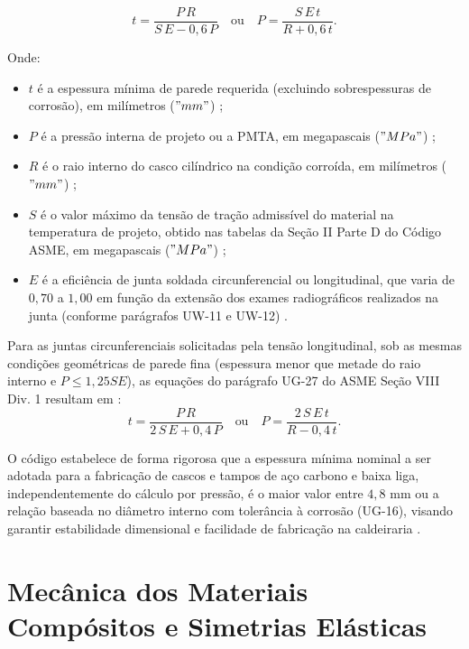 \begin{equation}
    t = \frac{P \, R}{S \, E - 0{,}6 \, P} \quad \text{ou} \quad P = \frac{S \, E \, t}{R + 0{,}6 \, t}.
\end{equation} \label{eq-asme-circunferencial}

Onde:

\begin{itemize}
  \item $t$ é a espessura mínima de parede requerida (excluindo sobrespessuras de corrosão), em milímetros ($"mm"$) \cite{asme_sec8_div1_2019};
  \item $P$ é a pressão interna de projeto ou a PMTA, em megapascais ($"MPa"$) \cite{asme_sec8_div1_2019};
  \item $R$ é o raio interno do casco cilíndrico na condição corroída, em milímetros ($"mm"$) \cite{asme_sec8_div1_2019};
  \item $S$ é o valor máximo da tensão de tração admissível do material na temperatura de projeto, obtido nas tabelas da Seção II Parte D do Código ASME, em megapascais ($"MPa"$) \cite{asme_sec8_div1_2019};
  \item $E$ é a eficiência de junta soldada circunferencial ou longitudinal, que varia de $0,70$ a $1,00$ em função da extensão dos exames radiográficos realizados na junta (conforme parágrafos UW-11 e UW-12) \cite{asme_sec8_div1_2019}.
\end{itemize}

Para as juntas circunferenciais solicitadas pela tensão longitudinal, sob as mesmas condições geométricas de parede fina (espessura menor que metade do raio interno e $P \le  1,25 S E$), as equações do parágrafo UG-27 do ASME Seção VIII Div. 1 resultam em \cite{asme_sec8_div1_2019}:
\begin{equation}
    t = \frac{P \, R}{2 \, S \, E + 0{,}4 \, P} \quad \text{ou} \quad P = \frac{2 \, S \, E \, t}{R - 0{,}4 \, t}.
\end{equation}\label{eq-asme-longitudinal}

O código estabelece de forma rigorosa que a espessura mínima nominal a ser adotada para a fabricação de cascos e tampos de aço carbono e baixa liga, independentemente do cálculo por pressão, é o maior valor entre $4,8$ mm ou a relação baseada no diâmetro interno com tolerância à corrosão (UG-16), visando garantir estabilidade dimensional e facilidade de fabricação na caldeiraria \cite{asme_sec8_div1_2019}.

\section{Mecânica dos Materiais Compósitos e Simetrias Elásticas}

